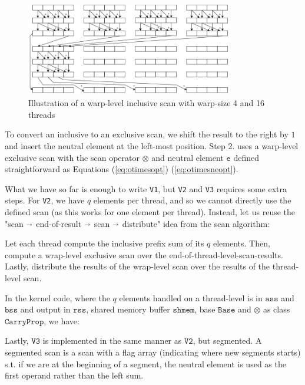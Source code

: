 \begin{figure}
  \centering
  \includegraphics[width=0.8\textwidth]{img/warp-level-scan.png}
  \caption{\footnotesize Illustration of a warp-level inclusive scan with warp-size 4 and 16 threads}
  \label{fig:warpscan}
\end{figure}

To convert an inclusive to an exclusive scan, we shift the result to the right
by $1$ and insert the neutral element at the left-most position. Step 2. uses a
warp-level exclusive scan with the scan operator $\otimes$ and neutral element
$\mathtt{e}$ defined straightforward as Equations (\ref{eq:otimesopt})
(\ref{eq:otimesneopt}).

What we have so far is enough to write \texttt{V1}, but \texttt{V2} and
\texttt{V3} requires some extra steps. For \texttt{V2}, we have $q$ elements per
thread, and so we cannot directly use the defined scan (as this works for one
element per thread). Instead, let us reuse the "scan $\shortrightarrow$
end-of-result $\shortrightarrow$ scan $\shortrightarrow$ distribute" idea from
the scan algorithm:

Let each thread compute the inclusive prefix sum of its $q$ elements. Then,
compute a wrap-level exclusive scan over the
end-of-thread-level-scan-results. Lastly, distribute the results of the
wrap-level scan over the results of the thread-level scan.

In the kernel code, where the $q$ elements handled on a thread-level is in
$\mathtt{ass}$ and $\mathtt{bss}$ and output in $\mathtt{rss}$, shared memory
buffer $\mathtt{shmem}$, base $\mathtt{Base}$ and $\otimes$ as class
$\mathtt{CarryProp}$, we have:



Lastly, $\mathtt{V3}$ is implemented in the same manner as $\mathtt{V2}$, but
segmented. A segmented scan is a scan with a flag array (indicating where new
segments starts) s.t. if we are at the beginning of a segment, the neutral
element is used as the first operand rather than the left sum.

